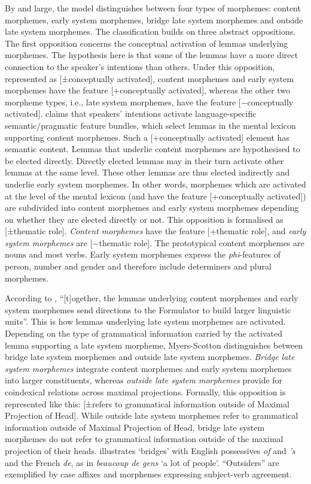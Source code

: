 By and large, the model distinguishes between four types of morphemes: content morphemes, early system morphemes, bridge late system morphemes and outside late system morphemes. The classification builds on three abstract oppositions. The first opposition concerns the conceptual activation of lemmas underlying morphemes. The hypothesis here is that some of the lemmas have a more direct connection to the speaker's intentions than others. Under this opposition, represented as [±conceptually activated], content morphemes and early system morphemes have the feature [+conceptually activated], whereas the other two morpheme types, i.e., late system morphemes, have the feature [−conceptually activated]. \citet{myers-scotton-contact-2002} claims that speakers' intentions activate language-specific semantic/pragmatic feature bundles, which select lemmas in the mental lexicon supporting content morphemes. Such a [+conceptually activated] element has semantic content. Lemmas that underlie content morphemes are hypothesised to be elected directly. Directly elected lemmas may in their turn activate other lemmas at the same level. These other lemmas are thus elected indirectly and underlie early system morphemes. In other words, morphemes  which are activated at the level of the mental lexicon (and have the feature [+conceptually activated]) are subdivided into content morphemes and early system morphemes depending on whether they are elected directly or not. This opposition is formalised as [±thematic role]. \textit{Content morphemes} have the feature [+thematic role], and \textit{early system morphemes} are [−thematic role]. The prototypical content morphemes are nouns and most verbs. Early system morphemes express the \textit{phi}-features of person, number and gender and therefore include determiners and plural morphemes.

According to \citet[][77]{myers-scotton-contact-2002}, ``[t]ogether, the lemmas underlying content morphemes and early system morphemes send directions to the Formulator to build larger linguistic units''. This is how lemmas underlying late system morphemes are activated. Depending on the type of grammatical information carried by the activated lemma supporting a late system morpheme, Myers-Scotton distinguishes between bridge late system morphemes and outside late system morphemes. \textit{Bridge late system morphemes} integrate content morphemes and early system morphemes into larger constituents, whereas \textit{outside late system morphemes} provide for coindexical relations across maximal projections. Formally, this opposition is represented like this: [±refers to grammatical information outside of Maximal Projection of Head]. While outside late system morphemes refer to grammatical information outside of Maximal Projection of Head, bridge late system morphemes do not refer to grammatical information outside of the maximal projection of their heads. \citet[75]{myers-scotton-contact-2002} illustrates `bridges' with English possessives \textit{of} and \textit{'s} and the French \textit{de}, as in \textit{beaucoup de gens} `a lot of people'. ``Outsiders'' are exemplified by case affixes and morphemes expressing subject-verb agreement.

